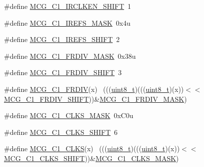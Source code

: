 \begin{DoxyCompactItemize}
\#define \hyperlink{group___m_c_g___register___masks_ga2c4305645e7c2b3977dcd0d35c7eaab9}{M\+C\+G\+\_\+\+C1\+\_\+\+I\+R\+C\+L\+K\+E\+N\+\_\+\+S\+H\+I\+FT}~1
\item 
\#define \hyperlink{group___m_c_g___register___masks_gadc14970d17e8ee736a16805a412a87fe}{M\+C\+G\+\_\+\+C1\+\_\+\+I\+R\+E\+F\+S\+\_\+\+M\+A\+SK}~0x4u
\item 
\#define \hyperlink{group___m_c_g___register___masks_gada376a938782b95d20788418a2564476}{M\+C\+G\+\_\+\+C1\+\_\+\+I\+R\+E\+F\+S\+\_\+\+S\+H\+I\+FT}~2
\item 
\#define \hyperlink{group___m_c_g___register___masks_gac7762b84f41121882f4d1fbcaa839aeb}{M\+C\+G\+\_\+\+C1\+\_\+\+F\+R\+D\+I\+V\+\_\+\+M\+A\+SK}~0x38u
\item 
\#define \hyperlink{group___m_c_g___register___masks_gaee124d0ce81f6e815dbbcac62440708b}{M\+C\+G\+\_\+\+C1\+\_\+\+F\+R\+D\+I\+V\+\_\+\+S\+H\+I\+FT}~3
\item 
\#define \hyperlink{group___m_c_g___register___masks_gae985172a227b87028daa388a2d8f5c93}{M\+C\+G\+\_\+\+C1\+\_\+\+F\+R\+D\+IV}(x)                                                ~(((\hyperlink{_p_e___types_8h_aba7bc1797add20fe3efdf37ced1182c5}{uint8\+\_\+t})(((\hyperlink{_p_e___types_8h_aba7bc1797add20fe3efdf37ced1182c5}{uint8\+\_\+t})(x))$<$$<$\hyperlink{group___m_c_g___register___masks_gaee124d0ce81f6e815dbbcac62440708b}{M\+C\+G\+\_\+\+C1\+\_\+\+F\+R\+D\+I\+V\+\_\+\+S\+H\+I\+FT}))\&\hyperlink{group___m_c_g___register___masks_gac7762b84f41121882f4d1fbcaa839aeb}{M\+C\+G\+\_\+\+C1\+\_\+\+F\+R\+D\+I\+V\+\_\+\+M\+A\+SK})
\item 
\#define \hyperlink{group___m_c_g___register___masks_gae9a1db29d56ef219e4df3dc9d945b08e}{M\+C\+G\+\_\+\+C1\+\_\+\+C\+L\+K\+S\+\_\+\+M\+A\+SK}~0x\+C0u
\item 
\#define \hyperlink{group___m_c_g___register___masks_ga9ca1068f336097a94984ba4bba0798d6}{M\+C\+G\+\_\+\+C1\+\_\+\+C\+L\+K\+S\+\_\+\+S\+H\+I\+FT}~6
\item 
\#define \hyperlink{group___m_c_g___register___masks_ga0a02c1e393278df8c0f9fec88693df8f}{M\+C\+G\+\_\+\+C1\+\_\+\+C\+L\+KS}(x)                                                  ~(((\hyperlink{_p_e___types_8h_aba7bc1797add20fe3efdf37ced1182c5}{uint8\+\_\+t})(((\hyperlink{_p_e___types_8h_aba7bc1797add20fe3efdf37ced1182c5}{uint8\+\_\+t})(x))$<$$<$\hyperlink{group___m_c_g___register___masks_ga9ca1068f336097a94984ba4bba0798d6}{M\+C\+G\+\_\+\+C1\+\_\+\+C\+L\+K\+S\+\_\+\+S\+H\+I\+FT}))\&\hyperlink{group___m_c_g___register___masks_gae9a1db29d56ef219e4df3dc9d945b08e}{M\+C\+G\+\_\+\+C1\+\_\+\+C\+L\+K\+S\+\_\+\+M\+A\+SK})

\end{DoxyCompactItemize}
